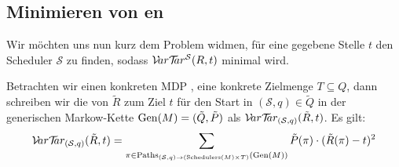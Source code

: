 \documentclass[a4paper]{article}
\newcommand{\mc}{Markow-Kette}
\theoremstyle{nonumberplain}
\begin{document}
\subsection{Minimieren von \vt{}en}

Wir möchten uns nun kurz dem Problem widmen, für eine gegebene Stelle $t$ den Scheduler $\mathcal{S}$ zu finden, sodass $\mathcal{V}\!ar \mathcal{T}\!\!ar^{\mathcal{S}}(R,t)$ minimal wird.
\begin{comment}
Unter den getroffenen Voraussetzungen existiert tatsächlich immer ein Minimum, wie wir im Folgenden sehen werden. Dazu beschreiben wir eine Funktion
\[
	f : Q \times \mathbb{R} \to \mathbb{R} \times A : (q,t) \mapsto (\nu,\alpha)\text{,}
\]
welche die zu wählende Aktion $\alpha$ und die resultierende \vt{} $\nu$ 
\end{comment} 
Betrachten wir einen konkreten MDP \mdpex{}, eine konkrete Zielmenge $T\subseteq Q$, dann schreiben wir die \vt{} von $\tilde{R}$ zum Ziel $t$ für den Start in $(\mathcal{S},q) \in \tilde{Q}$ in der generischen \mc{} $\mathrm{Gen}(M)=(\tilde{Q},\tilde{P})$ als $\mathcal{V}\!ar \mathcal{T}\!\!ar_{(\mathcal{S},q)}(\tilde{R},t)$. Es gilt:
\[
\mathcal{V}\!ar \mathcal{T}\!\!ar_{(\mathcal{S},q)}(\tilde{R},t) = \sum_{\pi \in \mathrm{Paths}_{(\mathcal{S},q) \rightarrow (\mathrm{Schedulers}(M)\times T)}(\mathrm{Gen}(M))}{	\tilde{P}(\pi) \cdot (\tilde{R}(\pi) - t)^2}
\]
\end{document}
